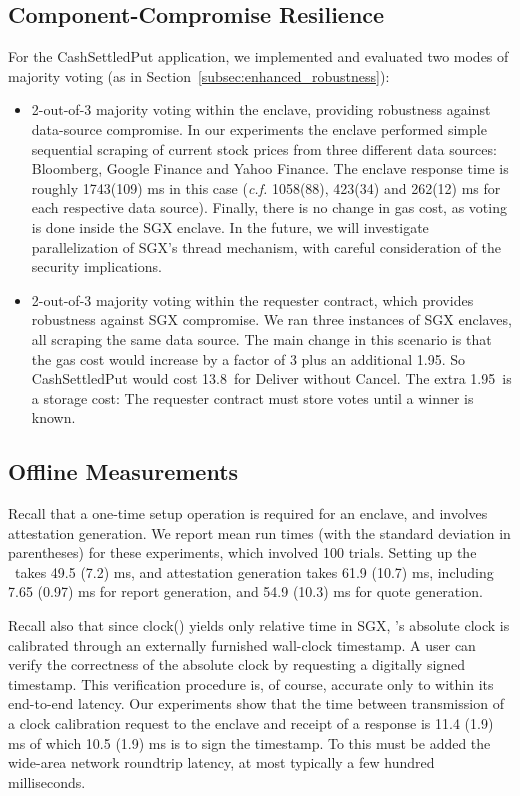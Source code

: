 \subsection{Component-Compromise Resilience}
\label{subsec:hedging}
For the {\sf CashSettledPut} application, 
we implemented and evaluated two modes of majority voting (as in Section~\ref{subsec:enhanced_robustness}):
\begin{itemize}[leftmargin=3mm]
  \setlength{\itemsep}{2pt}
  \setlength{\parskip}{0pt}
  \setlength{\parsep}{0pt}
\item
2-out-of-3 majority voting within the enclave, providing robustness
against data-source compromise. 
In our experiments
the enclave performed simple sequential scraping of current stock prices 
from three different data sources: Bloomberg, Google Finance and Yahoo Finance.
The enclave response time is roughly
1743(109) ms in this case ({\it c.f.}  
1058(88), 423(34) and 262(12) ms for 
each respective data source). Finally, there is no change in gas cost, as voting is done
inside the SGX enclave.
In the future, we will investigate parallelization of SGX's thread mechanism, with careful consideration of the security implications.


\item
2-out-of-3 majority voting within the requester contract,
which provides robustness against 
SGX compromise.
We ran three instances of SGX enclaves, all scraping
the same data source.  
The main change in this scenario is that 
the gas cost would increase by a factor of 3 plus an additional 1.95\textcent.
So {\sf CashSettledPut} would cost 13.8\textcent\ for Deliver without Cancel.
The extra 1.95\textcent\ is a storage cost: The requester contract must store votes
until a winner is known.
\end{itemize}


\subsection{Offline Measurements}
Recall that a one-time setup operation is required 
for an enclave, and involves attestation generation. We report mean run times (with the standard deviation in parentheses) for these experiments, which involved 100 trials.
Setting up the \tc~\encname takes
49.5 (7.2) ms,
and attestation generation takes 
61.9 (10.7) ms, including
7.65 (0.97) ms for report generation, 
and 54.9 (10.3) ms for quote generation.

Recall also that since clock() yields only relative time in SGX, \tc's absolute clock is calibrated through an externally furnished wall-clock timestamp.
A user can verify the correctness of the \encname absolute clock by requesting a digitally signed timestamp.
This verification procedure is, of course, accurate only to within its end-to-end latency. Our experiments show that the time between \medname transmission of a clock calibration request to the enclave and receipt of a response is
11.4 (1.9) ms of which 10.5 (1.9) ms is to 
sign the timestamp.
To this must be added the wide-area network roundtrip latency, at most typically a few hundred milliseconds. %
